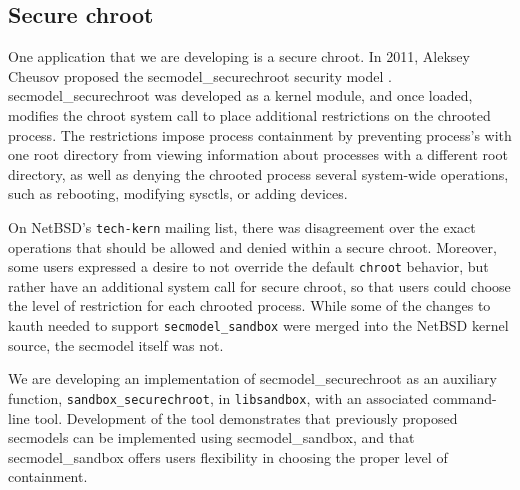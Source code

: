 \documentclass[letterpaper,twocolumn,9pt]{article}
\begin{document}
\subsection{Secure chroot}
One application that we are developing is a secure chroot.  In 2011, Aleksey
Cheusov proposed the secmodel\_securechroot security model
\cite{SecmodelSecureChroot}.  secmodel\_securechroot was developed as a kernel
module, and once loaded, modifies the chroot system call to place additional
restrictions on the chrooted process.  The restrictions impose process
containment by preventing process's with one root directory from viewing
information about processes with a different root directory, as well as denying
the chrooted process several system-wide operations, such as rebooting,
modifying sysctls, or adding devices. 

On NetBSD's \texttt{tech-kern} mailing list, there was disagreement over the
exact operations that should be allowed and denied within a secure chroot.
Moreover, some users expressed a desire to not override the default
\texttt{chroot} behavior, but rather have an additional system call for secure
chroot, so that users could choose the level of restriction for each chrooted
process.  While some of the changes to kauth needed to support
\texttt{secmodel\_sandbox} were merged into the NetBSD kernel source, the
secmodel itself was not.

We are developing an implementation of secmodel\_securechroot as an auxiliary
function, \texttt{sandbox\_securechroot}, in \texttt{libsandbox}, with an
associated command-line tool.  Development of the tool demonstrates that
previously proposed secmodels can be implemented using secmodel\_sandbox, and
that secmodel\_sandbox offers users flexibility in choosing the proper level of
containment.

\end{document}
